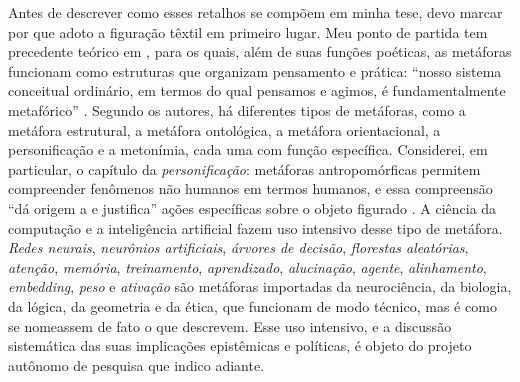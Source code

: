Antes de descrever como esses retalhos se compõem em minha tese, devo marcar por que adoto a figuração têxtil em primeiro lugar. Meu ponto de partida tem precedente teórico em \textcite{LakoffJohnson1980Metaphors}, para os quais, além de suas funções poéticas, as metáforas funcionam como estruturas que organizam pensamento e prática: \enquote{nosso sistema conceitual ordinário, em termos do qual pensamos e agimos, é fundamentalmente metafórico} \parencite[p.~3, tradução minha]{LakoffJohnson1980Metaphors}. Segundo os autores, há diferentes tipos de metáforas, como a metáfora estrutural, a metáfora ontológica, a metáfora orientacional, a personificação e a metonímia, cada uma com função específica. Considerei, em particular, o capítulo da \textit{personificação}: metáforas antropomórficas permitem compreender fenômenos não humanos em termos humanos, e essa compreensão \enquote{dá origem a e justifica} ações específicas sobre o objeto figurado \parencite[p.~34, tradução minha]{LakoffJohnson1980Metaphors}. A ciência da computação e a inteligência artificial fazem uso intensivo desse tipo de metáfora. \textit{Redes neurais}, \textit{neurônios artificiais}, \textit{árvores de decisão}, \textit{florestas aleatórias}, \textit{atenção}, \textit{memória}, \textit{treinamento}, \textit{aprendizado}, \textit{alucinação}, \textit{agente}, \textit{alinhamento}, \textit{embedding}, \textit{peso} e \textit{ativação} são metáforas importadas da neurociência, da biologia, da lógica, da geometria e da ética, que funcionam de modo técnico, mas é como se nomeassem de fato o que descrevem. Esse uso intensivo, e a discussão sistemática das suas implicações epistêmicas e políticas, é objeto do projeto autônomo de pesquisa que indico adiante.

